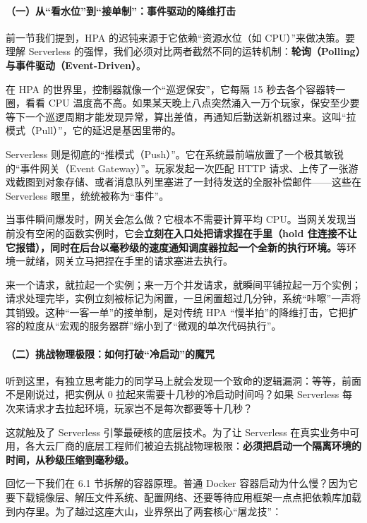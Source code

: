 \paragraph{（一）从“看水位”到“接单制”：事件驱动的降维打击}

前一节我们提到，HPA 的迟钝来源于它依赖“资源水位（如 CPU）”来做决策。要理解 Serverless 的强悍，我们必须对比两者截然不同的运转机制：\textbf{轮询（Polling）与事件驱动（Event-Driven）}。

在 HPA 的世界里，控制器就像一个“巡逻保安”，它每隔 15 秒去各个容器转一圈，看看 CPU 温度高不高。如果某天晚上八点突然涌入一万个玩家，保安至少要等下一个巡逻周期才能发现异常，算出差值，再通知后勤送新机器过来。这叫“拉模式（Pull）”，它的延迟是基因里带的。



Serverless 则是彻底的“推模式（Push）”。它在系统最前端放置了一个极其敏锐的“事件网关（Event Gateway）”。玩家发起一次匹配 HTTP 请求、上传了一张游戏截图到对象存储、或者消息队列里塞进了一封待发送的全服补偿邮件——这些在 Serverless 眼里，统统被称为“事件”。

当事件瞬间爆发时，网关会怎么做？它根本不需要计算平均 CPU。当网关发现当前没有空闲的函数实例时，它会\textbf{立刻在入口处把请求捏在手里（hold 住连接不让它报错），同时在后台以毫秒级的速度通知调度器拉起一个全新的执行环境。}等环境一就绪，网关立马把捏在手里的请求塞进去执行。

来一个请求，就拉起一个实例；来一万个并发请求，就瞬间平铺拉起一万个实例；请求处理完毕，实例立刻被标记为闲置，一旦闲置超过几分钟，系统“咔嚓”一声将其销毁。这种“一客一单”的接单制，是对传统 HPA “慢半拍”的降维打击，它把扩容的粒度从“宏观的服务器群”缩小到了“微观的单次代码执行”。

\paragraph{（二）挑战物理极限：如何打破“冷启动”的魔咒}

听到这里，有独立思考能力的同学马上就会发现一个致命的逻辑漏洞：等等，前面不是刚说过，把实例从 0 拉起来需要十几秒的冷启动时间吗？如果 Serverless 每次来请求才去拉起环境，玩家岂不是每次都要等十几秒？

这就触及了 Serverless 引擎最硬核的底层技术。为了让 Serverless 在真实业务中可用，各大云厂商的底层工程师们被迫去挑战物理极限：\textbf{必须把启动一个隔离环境的时间，从秒级压缩到毫秒级。}

回忆一下我们在 6.1 节拆解的容器原理。普通 Docker 容器启动为什么慢？因为它要下载镜像层、解压文件系统、配置网络、还要等待应用框架一点点把依赖库加载到内存里。为了越过这座大山，业界祭出了两套核心“屠龙技”：

